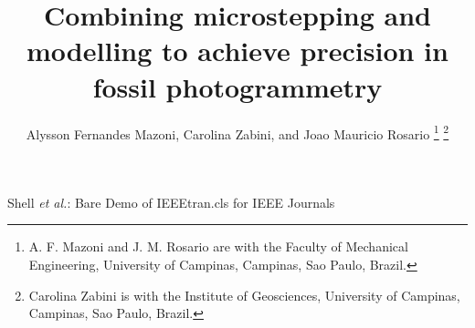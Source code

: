 \documentclass[journal]{IEEEtran}
\begin{document}
%
\title{Combining microstepping and modelling to achieve precision in fossil photogrammetry}
%
%
%

\author{Alysson Fernandes Mazoni,
        Carolina Zabini,
        and Joao Mauricio Rosario%
\thanks{A. F. Mazoni and J. M. Rosario are with the Faculty
of Mechanical Engineering, University of Campinas, Campinas,
Sao Paulo, Brazil.}%
\thanks{Carolina Zabini is with the Institute of Geosciences, University of Campinas, Campinas,
Sao Paulo, Brazil.}}

% 
%



%
{Shell \MakeLowercase{\textit{et al.}}: Bare Demo of IEEEtran.cls for IEEE Journals}
% 
\end{document}
